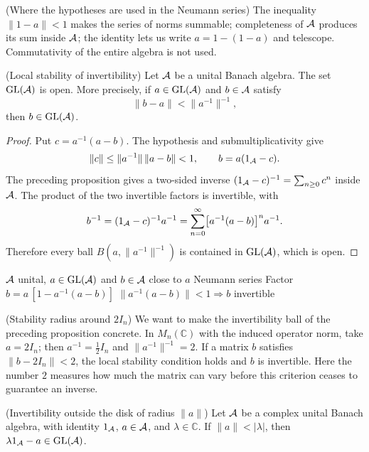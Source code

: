 \begin{cthnota}{(Where the hypotheses are used in the Neumann series)}
The inequality $\|1-a\|<1$ makes the series of norms summable; completeness of $\mathcal A$ produces
its sum inside $\mathcal A$; the identity lets us write $a=1-(1-a)$ and telescope.
Commutativity of the entire algebra is not used.
\end{cthnota}

\begin{cthproposicion}{(Local stability of invertibility)}
Let $\mathcal A$ be a unital Banach algebra. The set $\operatorname{GL}(\mathcal A)$ is open.
More precisely, if $a\in\operatorname{GL}(\mathcal A)$ and $b\in\mathcal A$ satisfy
\[
 \|b-a\|<\|a^{-1}\|^{-1},
\]
then $b\in\operatorname{GL}(\mathcal A)$.
\end{cthproposicion}

\begin{proof}[Proof]
Put $c=a^{-1}(a-b)$. The hypothesis and submultiplicativity give
\[
 \|c\|\le \|a^{-1}\|\,\|a-b\|<1,
 \qquad b=a(1_\mathcal A-c).
\]
The preceding proposition gives a two-sided inverse
$(1_\mathcal A-c)^{-1}=\sum_{n\ge0}c^n$ inside $\mathcal A$. The product of
the two invertible factors is invertible, with
\[
 b^{-1}=(1_\mathcal A-c)^{-1}a^{-1}
 =\sum_{n=0}^{\infty}\bigl[a^{-1}(a-b)\bigr]^n a^{-1}.
\]
Therefore every ball $B(a,\|a^{-1}\|^{-1})$ is contained in
$\operatorname{GL}(\mathcal A)$, which is open.
\end{proof}

\proofdiagram
{$\mathcal A$ unital, $a\in\operatorname{GL}(\mathcal A)$ and $b\in\mathcal A$ close to $a$}
{Neumann series}
{Factor $b=a\,[1-a^{-1}(a-b)]$}
{$\|a^{-1}(a-b)\|<1\Rightarrow b$ invertible}

\begin{cthejemplo}{(Stability radius around $2I_n$)}
We want to make the invertibility ball of the preceding proposition concrete.
In $M_n(\mathbb C)$ with the induced operator norm, take
$a=2I_n$; then $a^{-1}=\frac12I_n$ and
$\|a^{-1}\|^{-1}=2$. If a matrix $b$ satisfies
$\|b-2I_n\|<2$, the local stability condition holds and
$b$ is invertible. Here the number $2$ measures how much the
matrix can vary before this criterion ceases to guarantee an inverse.
\end{cthejemplo}

\begin{cthcorolario}{(Invertibility outside the disk of radius $\|a\|$)}
Let $\mathcal A$ be a complex unital Banach algebra, with identity $1_\mathcal A$,
$a\in\mathcal A$, and $\lambda\in\mathbb C$. If $\|a\|<|\lambda|$, then
$\lambda1_\mathcal A-a\in\operatorname{GL}(\mathcal A)$.
\end{cthcorolario}

